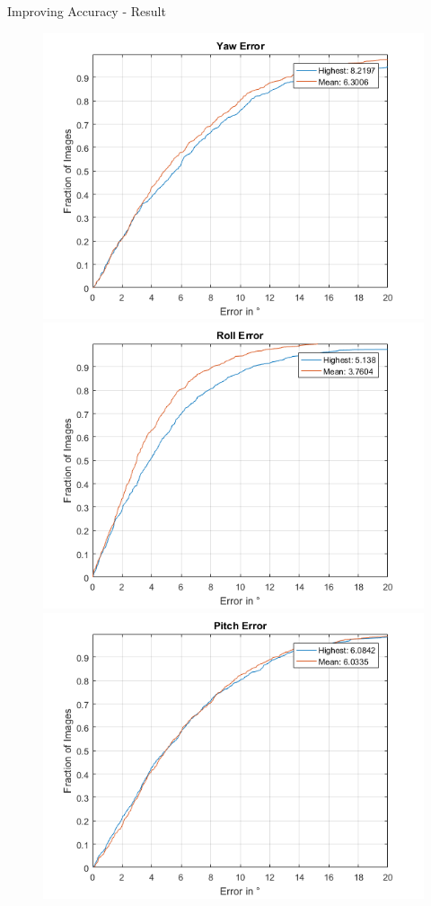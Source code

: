 \documentclass{beamer}
\begin{document}
\begin{frame}{Improving Accuracy - Result}

\begin{figure}
\centering
\includegraphics[scale=0.32]{fig/yaw_pose_error_mean_vs_highest}
\includegraphics[scale=0.32]{fig/roll_pose_error_mean_vs_highest}
\includegraphics[scale=0.32]{fig/pitch_pose_error_mean_vs_highest}
\end{figure}
\end{frame}
\end{document}
